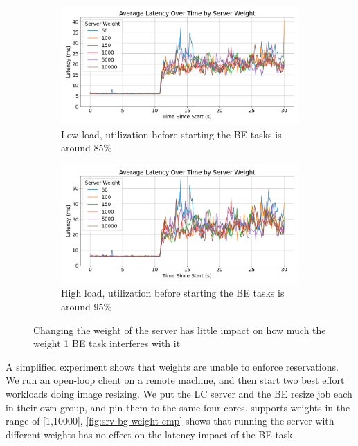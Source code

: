 \begin{figure}[t]
    \centering
    \begin{subfigure}{\columnwidth}
        \includegraphics[width=\columnwidth]{graphs/srv-bg-weight-cmp-low.png}
        \caption{Low load, utilization before starting the BE tasks is
        around 85\%}\label{fig:srv-bg-weight-cmp-low}
        \vspace{12pt}
    \end{subfigure}
    \hspace{\fill}
    \begin{subfigure}{\columnwidth}
        \includegraphics[width=\columnwidth]{graphs/srv-bg-weight-cmp-high.png}
        \caption{High load, utilization before starting the BE tasks is around
        95\%}\label{fig:srv-bg-weight-cmp-high}
    \end{subfigure}
    \vspace{4pt}
    \caption{Changing the weight of the server has little impact on how much the
    weight 1 BE task interferes with it}\label{fig:srv-bg-weight-cmp}
\end{figure}


A simplified experiment shows that \cgroups{} weights are unable to enforce
reservations. We run an open-loop client on a remote machine, and then start two
best effort workloads doing image resizing. We put the LC server and the BE
resize job each in their own group, and pin them to the same four cores.
\cgroups{} supports weights in the range of [1,10000],
\autoref{fig:srv-bg-weight-cmp} shows that running the server with different
weights has no effect on the latency impact of the BE task.


